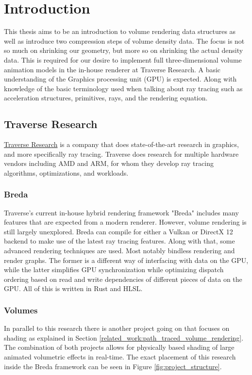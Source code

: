 \section{Introduction} \label{introduction}
This thesis aims to be an introduction to volume rendering data structures as well as introduce two compression steps of volume density data. The focus is not so much on shrinking our geometry, but more so on shrinking the actual density data. This is required for our desire to implement full three-dimensional volume animation models in the in-house renderer at Traverse Research. A basic understanding of the Graphics processing unit (GPU) is expected. Along with knowledge of the basic terminology used when talking about ray tracing such as acceleration structures, primitives, rays, and the rendering equation.


\subsection{Traverse Research} \label{introduction:traverse_research}
\href{https://traverseresearch.nl/}{Traverse Research} is a company that does state-of-the-art research in graphics, and more specifically ray tracing. Traverse does research for multiple hardware vendors including AMD and ARM, for whom they develop ray tracing algorithms, optimizations, and workloads.
\subsubsection{Breda} \label{introduction:traverse_research:breda}
Traverse's current in-house hybrid rendering framework "Breda" includes many features that are expected from a modern renderer. However, volume rendering is still largely unexplored. Breda can compile for either a Vulkan or DirectX 12 backend to make use of the latest ray tracing features. Along with that, some advanced rendering techniques are used. Most notably bindless rendering\cite{BindlessRenderingSetup} and render graphs\cite{RenderGraph101}. The former is a different way of interfacing with data on the GPU, while the latter simplifies GPU synchronization while optimizing dispatch ordering based on read and write dependencies of different pieces of data on the GPU. All of this is written in Rust and HLSL.
\subsubsection{Volumes} \label{introduction:traverse_research:volumes}
In parallel to this research there is another project going on that focuses on shading as explained in Section \ref{related_work:path_traced_volume_rendering}. The combination of both projects allows for physically based shading of large animated volumetric effects in real-time. The exact placement of this research inside the Breda framework can be seen in Figure \ref{fig:project_structure}.

